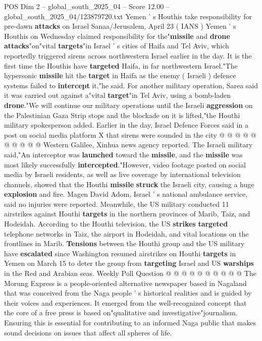 \begin{textsample}{POS Dim 2 – global\_south\_2025\_04 – Score 12.00 – global\_south\_2025\_04/123879720.txt}  \label{ex:f2_pos_348}
Yemen ' s Houthis take responsibility for pre-dawn \textbf{attacks} on Israel Sanaa/Jerusalem, April 23 ( IANS ) Yemen ' s Houthis on Wednesday claimed responsibility for the"\textbf{missile} and \textbf{drone} \textbf{attacks}"on"vital \textbf{targets}"in Israel ' s cities of Haifa and Tel Aviv, which reportedly triggered sirens across northwestern Israel earlier in the day.
It is the first time the Houthis have \textbf{targeted} Haifa, in far northwestern Israel."The hypersonic \textbf{missile} hit the \textbf{target} in Haifa as the enemy ( Israeli ) defence systems failed to \textbf{intercept} it,"he said.
For another military operation, Sarea said it was carried out against a"vital \textbf{target}"in Tel Aviv, using a bomb-laden \textbf{drone}."We will continue our military operations until the Israeli \textbf{aggression} on the Palestinian Gaza Strip stops and the blockade on it is lifted,"the Houthi military spokesperson added.
Earlier in the day, Israel Defence Forces said in a post on social media platform X that sirens were sounded in the city @ @ @ @ @ @ @ @ @ @ Western Galilee, Xinhua news agency reported.
The Israeli military said,"An interceptor was \textbf{launched} toward the \textbf{missile}, and the \textbf{missile} was most likely successfully \textbf{intercepted}."However, video footage posted on social media by Israeli residents, as well as live coverage by international television channels, showed that the Houthi \textbf{missile} \textbf{struck} the Israeli city, causing a huge \textbf{explosion} and fire.
Magen David Adom, Israel ' s national ambulance service, said no injuries were reported.
Meanwhile, the US military conducted 11 airstrikes against Houthi \textbf{targets} in the northern provinces of Marib, Taiz, and Hodeidah.
According to the Houthi television, the US \textbf{strikes} \textbf{targeted} telephone networks in Taiz, the airport in Hodeidah, and vital locations on the frontlines in Marib. \textbf{Tensions} between the Houthi group and the US military have \textbf{escalated} since Washington resumed airstrikes on Houthi \textbf{targets} in Yemen on March 15 to deter the group from \textbf{targeting} Israel and US \textbf{warships} in the Red and Arabian seas.
Weekly Poll Question @ @ @ @ @ @ @ @ @ @ The Morung Express is a people-oriented alternative newspaper based in Nagaland that was conceived from the Naga people ' s historical realities and is guided by their voices and experiences.
It emerged from the well-recognized concept that the core of a free press is based on"qualitative and investigative"journalism.
Ensuring this is essential for contributing to an informed Naga public that makes sound decisions on issues that affect all spheres of life.

\end{textsample}
